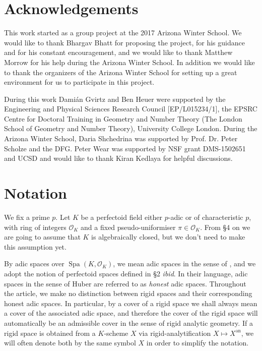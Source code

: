 \documentclass[10pt,oneside]{amsart}
\theoremstyle{definition}
\begin{document}
 \section*{Acknowledgements}
 This work started as a group project at the 2017 Arizona Winter School. We would like to thank Bhargav Bhatt for proposing the project, for his guidance and for his constant encouragement, and we would like to thank Matthew Morrow for his help during the Arizona Winter School. In addition we would like to thank the organizers of the Arizona Winter School for setting up a great environment for us to participate in this project. 
 
 During this work Dami\'an Gvirtz and Ben Heuer were supported by the Engineering and Physical Sciences Research Council [EP/L015234/1], the EPSRC Centre for Doctoral Training in Geometry and Number Theory (The London School of Geometry and Number Theory), University College London. 
 During the Arizona Winter School, Daria Shchedrina was supported by Prof. Dr. Peter Scholze and the DFG.
 Peter Wear was supported by NSF grant DMS-1502651 and UCSD and would like to thank Kiran Kedlaya for helpful discussions.


\section*{Notation}
	We fix a prime $p$.  Let $K$ be a perfectoid field either $p$-adic or of characteristic $p$, with ring of integers  $\mathcal O_K$ and  a fixed pseudo-uniformiser $\pi\in \mathcal O_K$. From \S4 on we are going to assume that $K$ is algebraically closed, but we don't need to make this assumption yet.
	
	By adic spaces over $\operatorname{Spa}(K,\mathcal O_K)$, we mean adic spaces in the sense of \cite{SW}, and we adopt the notion of perfectoid spaces defined in \S2 \textit{\small ibid}. In their language, adic spaces in the sense of Huber are referred to as \textit{honest} adic spaces. Throughout the article, we make no distinction between rigid spaces and their corresponding honest adic spaces.
	In particular, by a cover of a rigid space we shall always mean a cover of the associated adic space, and therefore the cover of the rigid space will automatically be an admissible cover in the sense of rigid analytic geometry. 
	If a rigid space is obtained from a $K$-scheme $X$ via rigid-analytification $X\mapsto X^{\operatorname{an}}$, we will often denote both by the same symbol $X$ in order to simplify the notation.
	
\end{document}

